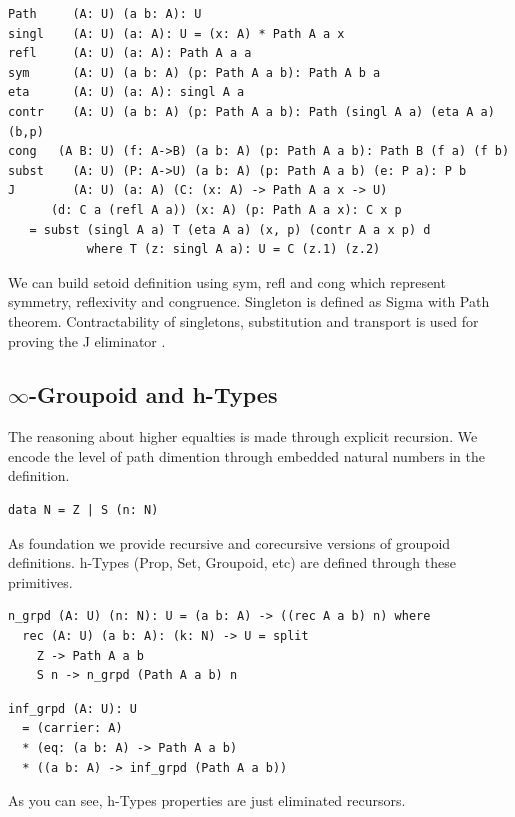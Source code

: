 \documentclass{article}
\begin{document}
\begin{lstlisting}[mathescape=true]
Path     (A: U) (a b: A): U
singl    (A: U) (a: A): U = (x: A) * Path A a x
refl     (A: U) (a: A): Path A a a
sym      (A: U) (a b: A) (p: Path A a b): Path A b a
eta      (A: U) (a: A): singl A a
contr    (A: U) (a b: A) (p: Path A a b): Path (singl A a) (eta A a) (b,p)
cong   (A B: U) (f: A->B) (a b: A) (p: Path A a b): Path B (f a) (f b)
subst    (A: U) (P: A->U) (a b: A) (p: Path A a b) (e: P a): P b
J        (A: U) (a: A) (C: (x: A) -> Path A a x -> U)
      (d: C a (refl A a)) (x: A) (p: Path A a x): C x p
   = subst (singl A a) T (eta A a) (x, p) (contr A a x p) d
           where T (z: singl A a): U = C (z.1) (z.2)
\end{lstlisting}

We can build setoid \cite{Bishop67} definition using sym, refl and cong which
represent symmetry, reflexivity and congruence.
Singleton is defined as Sigma with Path theorem. Contractability of singletons,
substitution and transport is used for proving the J eliminator \cite{HoTT}.

\subsection{$\infty$-Groupoid and h-Types}

The reasoning about higher equalties is made through explicit recursion.
We encode the level of path dimention through embedded natural numbers in the definition.

\begin{lstlisting}[mathescape=true]
data N = Z | S (n: N)
\end{lstlisting}

As foundation we provide recursive and corecursive versions of groupoid definitions.
h-Types \cite{HoTT} (Prop, Set, Groupoid, etc) are defined through these primitives.

\begin{lstlisting}[mathescape=true]
n_grpd (A: U) (n: N): U = (a b: A) -> ((rec A a b) n) where
  rec (A: U) (a b: A): (k: N) -> U = split
    Z -> Path A a b
    S n -> n_grpd (Path A a b) n
\end{lstlisting}

\begin{lstlisting}
inf_grpd (A: U): U
  = (carrier: A)
  * (eq: (a b: A) -> Path A a b)
  * ((a b: A) -> inf_grpd (Path A a b))
\end{lstlisting}

As you can see, h-Types properties are just eliminated recursors.
\end{document}
